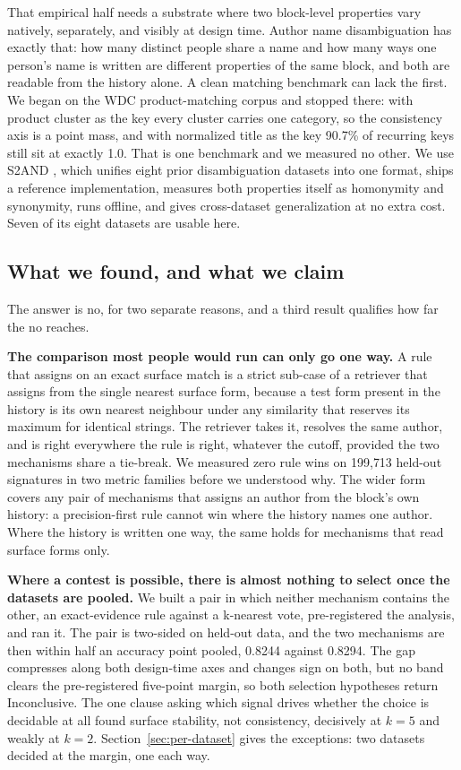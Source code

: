 \documentclass[11pt]{article}
\begin{document}
That empirical half needs a substrate where two block-level properties vary
natively, separately, and visibly at design time. Author name disambiguation
has exactly that: how many distinct people share a name and how many ways one
person's name is written are different properties of the same block, and both
are readable from the history alone. A clean matching benchmark can lack the
first. We began on the WDC product-matching corpus \citep{primpeli2019wdc} and
stopped there: with product cluster as the key every cluster carries one
category, so the consistency axis is a point mass, and with normalized title
as the key 90.7\% of recurring keys still sit at exactly 1.0. That is one
benchmark and we measured no other. We use S2AND
\citep{s2and2021}, which unifies eight prior disambiguation datasets into one
format, ships a reference implementation, measures both properties itself as
homonymity and synonymity, runs offline, and gives cross-dataset
generalization at no extra cost. Seven of its eight datasets are usable here.

\subsection{What we found, and what we claim}
\label{sec:what-we-found}

The answer is no, for two separate reasons, and a third result qualifies how
far the no reaches.

\textbf{The comparison most people would run can only go one way.} A rule
that assigns on an exact surface match is a strict sub-case of a retriever
that assigns from the single nearest surface form, because a test form present in the history is its own nearest neighbour under any similarity that reserves its maximum for identical strings. The retriever takes it, resolves the same author, and is right everywhere the rule is right, whatever the cutoff, provided the two mechanisms share a tie-break. We
measured zero rule
wins on 199{,}713 held-out signatures in two metric families before we
understood why. The wider form covers any pair of mechanisms that assigns an
author from the block's own history: a precision-first rule cannot win where
the history names one author. Where the history is written one way, the same
holds for mechanisms that read surface forms only.

\textbf{Where a contest is possible, there is almost nothing to select once
the datasets are pooled.} We
built a pair in which neither mechanism contains the other, an exact-evidence rule against a
k-nearest vote, pre-registered the analysis, and ran it. The pair is two-sided
on held-out data, and the two mechanisms are then within half an accuracy
point pooled, 0.8244 against 0.8294. The gap compresses along both design-time
axes and changes sign on both, but no band clears the pre-registered
five-point margin, so both selection hypotheses return Inconclusive. The one
clause asking which signal drives whether the choice is decidable at all found
surface stability, not consistency, decisively at $k = 5$ and weakly at $k = 2$.
Section~\ref{sec:per-dataset} gives the exceptions: two datasets decided at
the margin, one each way.
\end{document}
